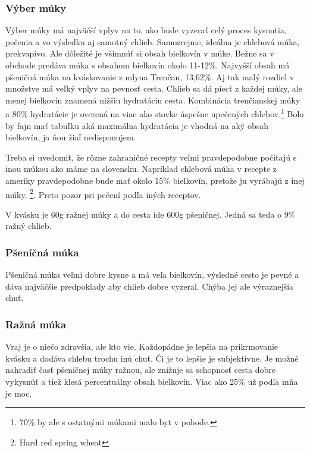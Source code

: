 \documentclass[a4paper,12pt]{article}
\begin{document}
\subsubsection{Výber múky}
Výber múky má najväčší vplyv na to, ako bude vyzerať celý proces kysnutia, pečenia a vo výsledku aj samotný chlieb. Samozrejme, ideálna je chlebová múka, prekvapivo. Ale dôležité je všimnúť si obsah bielkovín v múke. Bežne sa v obchode predáva múka s obsahom bielkovín okolo 11-12\%. Najvyšší obsah má pšeničná múka na kváskovanie z mlyna Trenčan, 13,62\%. Aj tak malý rozdiel v množstve má veľký vplyv na pevnosť cesta. Chlieb sa dá piecť z každej múky, ale menej bielkovín znamená nižšiu hydratáciu cesta. Kombinácia trenčianskej múky a 80\% hydratácie je overená na viac ako stovke úspešne upečených chlebov.\footnote{70\% by ale s ostatnými múkami malo byt v pohode.} Bolo by fajn mať tabuľku aká maximálna hydratácia je vhodná na aký obsah bielkovín, ja ňou žiaľ nedisponujem.

Treba si uvedomiť, že rôzne zahraničné recepty veľmi pravdepodobne počítajú s inou múkou ako máme na slovensku. Napríklad chlebová múka v recepte z ameriky pravdepodobne bude mať okolo 15\% bielkovín, pretože ju vyrábajú z inej múky. \footnote{Hard red spring wheat}. Preto pozor pri pečení podľa iných receptov.

V kvásku je 60g ražnej múky a do cesta ide 600g pšeničnej. Jedná sa teda o 9\% ražný chlieb.


\subsubsection{Pšeníčná múka}
Pšeničná múka veľmi dobre kysne a má veľa bielkovín, výsledné cesto je pevné a dáva najväčšie predpoklady aby chlieb dobre vyzeral. Chýba jej ale výraznejšia chuť.
\subsubsection{Ražná múka}
Vraj je o niečo zdravšia, ale kto vie. Každopádne je lepšia na prikrmovanie kvásku a dodáva chlebu trochu inú chuť. Či je to lepšie je subjektívne. Je možné  nahradiť časť pšeničnej múky ražnou, ale znižuje sa schopnosť cesta dobre vykysnúť a tiež klesá percentuálny obsah bielkovín. Viac ako 25\% už podľa mňa je moc.
\end{document}

